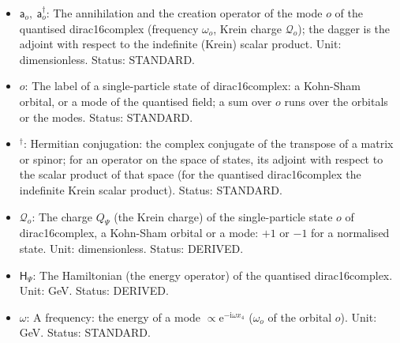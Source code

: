\documentclass[
  10pt,
]{article}
\providecommand{\tightlist}{%
  \setlength{\itemsep}{0pt}\setlength{\parskip}{0pt}}
\begin{document}
\begin{itemize}
\tightlist
\item
  \(\mathsf{a}_o,\ \mathsf{a}_o^\dagger\): The annihilation and the
  creation operator of the mode \(o\) of the quantised dirac16complex
  (frequency \(\omega_o\), Krein charge \(\mathcal{Q}_o\)); the dagger
  is the adjoint with respect to the indefinite (Krein) scalar product.
  Unit: dimensionless. Status: STANDARD.
\item
  \(o\): The label of a single-particle state of dirac16complex: a
  Kohn-Sham orbital, or a mode of the quantised field; a sum over \(o\)
  runs over the orbitals or the modes. Status: STANDARD.
\item
  \({}^\dagger\): Hermitian conjugation: the complex conjugate of the
  transpose of a matrix or spinor; for an operator on the space of
  states, its adjoint with respect to the scalar product of that space
  (for the quantised dirac16complex the indefinite Krein scalar
  product). Status: STANDARD.
\item
  \(\mathcal{Q}_o\): The charge \(Q_\Psi\) (the Krein charge) of the
  single-particle state \(o\) of dirac16complex, a Kohn-Sham orbital or
  a mode: \(+1\) or \(-1\) for a normalised state. Unit: dimensionless.
  Status: DERIVED.
\item
  \(\mathsf{H}_\Psi\): The Hamiltonian (the energy operator) of the
  quantised dirac16complex. Unit: GeV. Status: DERIVED.
\item
  \(\omega\): A frequency: the energy of a mode
  \(\propto \mathrm{e}^{-\mathrm{i}\omega x_4}\) (\(\omega_o\) of the
  orbital \(o\)). Unit: GeV. Status: STANDARD.
\end{itemize}
\end{document}
